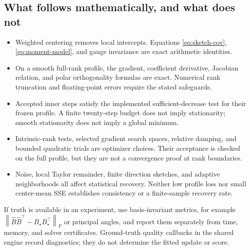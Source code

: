 \documentclass[11pt,a4paper]{article}
\newcommand{\norm}[1]{\left\lVert#1\right\rVert}
\begin{document}
\subsection{What follows mathematically, and what does not}
\begin{itemize}[leftmargin=*]
\item Weighted centering removes local intercepts. Equations
\eqref{eq:sketch-cov}, \eqref{eq:moment-model}, and gauge invariance are
exact arithmetic identities.
\item On a smooth full-rank profile, the gradient, coefficient derivative,
Jacobian relation, and polar orthogonality formulas are exact. Numerical
rank truncation and floating-point errors require the stated safeguards.
\item Accepted inner steps satisfy the implemented sufficient-decrease
test for their frozen profile. A finite twenty-step budget does not imply
stationarity; smooth stationarity does not imply a global minimum.
\item Intrinsic-rank tests, selected gradient search spaces, relative
damping, and bounded quadratic trials are optimizer choices. Their
acceptance is checked on the full profile, but they are not a convergence
proof at rank boundaries.
\item Noise, local Taylor remainder, finite direction sketches, and
adaptive neighborhoods all affect statistical recovery. Neither low
profile loss nor small center-mean SSE establishes consistency or a
finite-sample recovery rate.
\end{itemize}
If truth is available in an experiment, use basis-invariant metrics, for
example $\norm{\widehat B\widehat B^\top-B_\star B_\star^\top}_F$
or principal angles, and report them separately from time, memory, and
solver certificates. Ground-truth quality callbacks in the shared engine
record diagnostics; they do not determine the fitted update or score.

\appendix
\end{document}
